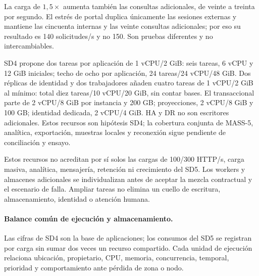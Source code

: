 La carga de \(1{,}5\times\) aumenta también las consultas adicionales, de veinte a treinta por segundo. El estrés de portal duplica únicamente las sesiones externas y mantiene las cincuenta internas y las veinte consultas adicionales; por eso su resultado es 140 solicitudes/s y no 150. Son pruebas diferentes y no intercambiables.

SD4 propone dos tareas por aplicación de 1 vCPU/2 GiB: seis tareas, 6 vCPU y 12 GiB iniciales; techo de ocho por aplicación, 24 tareas/24 vCPU/48 GiB. Dos réplicas de identidad y dos trabajadores añaden cuatro tareas de 1 vCPU/2 GiB al mínimo: total diez tareas/10 vCPU/20 GiB, sin contar bases. El transaccional parte de 2 vCPU/8 GiB por instancia y 200 GB; proyecciones, 2 vCPU/8 GiB y 100 GB; identidad dedicada, 2 vCPU/4 GiB. HA y DR no son escritores adicionales. Estos recursos son hipótesis SD4; la cobertura conjunta de MASS-5, analítica, exportación, muestras locales y reconexión sigue pendiente de conciliación y ensayo.

Estos recursos no acreditan por sí solos las cargas de 100/300 HTTP/s, carga masiva, analítica, mensajería, retención ni crecimiento del SD5. Los workers y almacenes adicionales se individualizan antes de aceptar la mezcla contractual y el escenario de falla. Ampliar tareas no elimina un cuello de escritura, almacenamiento, identidad o atención humana.

\paragraph{Balance común de ejecución y almacenamiento.}
Las cifras de SD4 son la base de aplicaciones; los consumos del SD5 se registran por carga sin sumar dos veces un recurso compartido. Cada unidad de ejecución relaciona ubicación, propietario, CPU, memoria, concurrencia, temporal, prioridad y comportamiento ante pérdida de zona o nodo.


